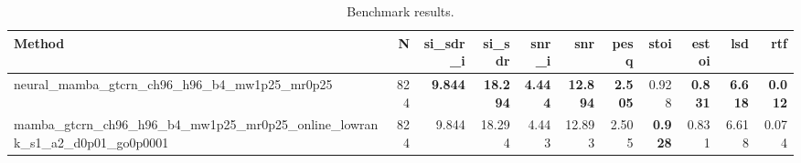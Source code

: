 \begin{table}[t]
\centering
\caption{Benchmark results.}
\label{tab:bench}
\begin{tabular}{lrrrrrrrrrr}
\toprule
Method & N & si\_sdr\_i & si\_sdr & snr\_i & snr & pesq & stoi & estoi & lsd & rtf \\
\midrule
neural_mamba_gtcrn_ch96_h96_b4_mw1p25_mr0p25 & 824 & \textbf{9.844} & \textbf{18.294} & \textbf{4.444} & \textbf{12.894} & \textbf{2.505} & 0.928 & \textbf{0.831} & \textbf{6.618} & \textbf{0.012} \\
mamba_gtcrn_ch96_h96_b4_mw1p25_mr0p25_online_lowrank_s1_a2_d0p01_go0p0001 & 824 & 9.844 & 18.294 & 4.443 & 12.893 & 2.505 & \textbf{0.928} & 0.831 & 6.618 & 0.074 \\
\bottomrule
\end{tabular}
\end{table}